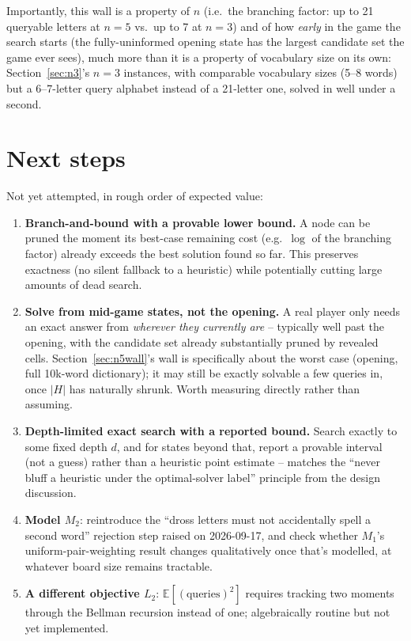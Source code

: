 \documentclass[11pt]{article}
\begin{document}
Importantly, this wall is a property of $n$ (i.e.\ the branching factor:
up to 21 queryable letters at $n=5$ vs.\ up to 7 at $n=3$) and of how
\emph{early} in the game the search starts (the fully-uninformed opening
state has the largest candidate set the game ever sees), much more than it
is a property of vocabulary size on its own: Section~\ref{sec:n3}'s
$n=3$ instances, with comparable vocabulary sizes (5--8 words) but a
6--7-letter query alphabet instead of a 21-letter one, solved in
well under a second.

\section{Next steps}
\label{sec:nextsteps}

Not yet attempted, in rough order of expected value:

\begin{enumerate}
  \item \textbf{Branch-and-bound with a provable lower bound.} A node can
  be pruned the moment its best-case remaining cost (e.g.\ $\log$ of the
  branching factor) already exceeds the best solution found so far. This
  preserves exactness (no silent fallback to a heuristic) while potentially
  cutting large amounts of dead search.
  \item \textbf{Solve from mid-game states, not the opening.} A real player
  only needs an exact answer from \emph{wherever they currently are} --
  typically well past the opening, with the candidate set already
  substantially pruned by revealed cells. Section~\ref{sec:n5wall}'s wall
  is specifically about the worst case (opening, full 10k-word dictionary);
  it may still be exactly solvable a few queries in, once $|H|$ has
  naturally shrunk. Worth measuring directly rather than assuming.
  \item \textbf{Depth-limited exact search with a reported bound.} Search
  exactly to some fixed depth $d$, and for states beyond that, report a
  provable interval (not a guess) rather than a heuristic point estimate --
  matches the ``never bluff a heuristic under the optimal-solver label''
  principle from the design discussion.
  \item \textbf{Model $M_2$}: reintroduce the ``dross letters must not
  accidentally spell a second word'' rejection step raised on 2026-09-17,
  and check whether $M_1$'s uniform-pair-weighting result changes
  qualitatively once that's modelled, at whatever board size remains
  tractable.
  \item \textbf{A different objective $L_2$}: $\mathbb{E}[(\text{queries})^2]$
  requires tracking two moments through the Bellman recursion instead of
  one; algebraically routine but not yet implemented.
\end{enumerate}
\end{document}
